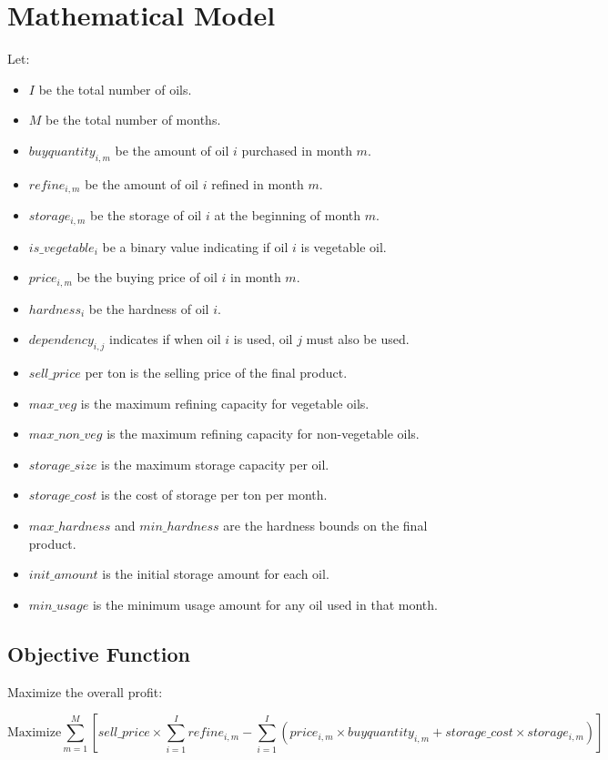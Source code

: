 \documentclass{article}
\begin{document}
\section*{Mathematical Model}

Let:
\begin{itemize}
    \item $I$ be the total number of oils.
    \item $M$ be the total number of months.
    \item $buyquantity_{i,m}$ be the amount of oil $i$ purchased in month $m$.
    \item $refine_{i,m}$ be the amount of oil $i$ refined in month $m$.
    \item $storage_{i,m}$ be the storage of oil $i$ at the beginning of month $m$.
    \item $is\_vegetable_i$ be a binary value indicating if oil $i$ is vegetable oil.
    \item $price_{i,m}$ be the buying price of oil $i$ in month $m$.
    \item $hardness_i$ be the hardness of oil $i$.
    \item $dependency_{i,j}$ indicates if when oil $i$ is used, oil $j$ must also be used.
    \item $sell\_price$ per ton is the selling price of the final product.
    \item $max\_veg$ is the maximum refining capacity for vegetable oils.
    \item $max\_non\_veg$ is the maximum refining capacity for non-vegetable oils.
    \item $storage\_size$ is the maximum storage capacity per oil.
    \item $storage\_cost$ is the cost of storage per ton per month.
    \item $max\_hardness$ and $min\_hardness$ are the hardness bounds on the final product.
    \item $init\_amount$ is the initial storage amount for each oil.
    \item $min\_usage$ is the minimum usage amount for any oil used in that month.
\end{itemize}

\subsection*{Objective Function}
Maximize the overall profit:

\[
\text{Maximize} \sum_{m=1}^{M} \left[ sell\_price \times \sum_{i=1}^{I} refine_{i,m} - \sum_{i=1}^{I} \left( price_{i,m} \times buyquantity_{i,m} + storage\_cost \times storage_{i,m} \right) \right]
\]
\end{document}

